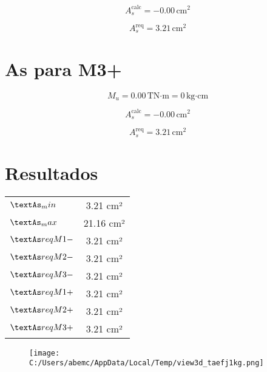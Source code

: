 \documentclass[12pt]{article}
\begin{document}
\[
A_s^{\text{calc}} = -0.00\,\text{cm}^2
\]

\[
A_s^{\text{req}} = 3.21\,\text{cm}^2
\]

\vspace{0.5cm}

\section*{ As para M3+ }

\[
M_u = 0.00\,\text{TN·m} = 0\,\text{kg·cm}
\]

\[
A_s^{\text{calc}} = -0.00\,\text{cm}^2
\]

\[
A_s^{\text{req}} = 3.21\,\text{cm}^2
\]

\vspace{0.5cm}



\section*{Resultados}
\begin{tabular}{|l|c|}
\hline

$\textAs_min$ & 3.21 cm² \\

$\textAs_max$ & 21.16 cm² \\

$\textAs req M1-$ & 3.21 cm² \\

$\textAs req M2-$ & 3.21 cm² \\

$\textAs req M3-$ & 3.21 cm² \\

$\textAs req M1+$ & 3.21 cm² \\

$\textAs req M2+$ & 3.21 cm² \\

$\textAs req M3+$ & 3.21 cm² \\

\hline
\end{tabular}



\begin{figure}[H]
\centering
\texttt{[image: C:/Users/abemc/AppData/Local/Temp/view3d\_taefj1kg.png]}
\end{figure}
\end{document}
